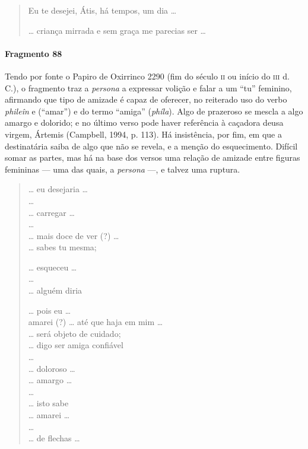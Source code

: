 {\begin{verse}
Eu te desejei, Átis, há tempos, um dia \ldots{}

\ast\quad\ast\quad\ast

\ldots{} criança mirrada e sem graça me parecias ser \ldots{}
\end{verse}

\paragraph{Fragmento 88}

{\small Tendo por fonte o Papiro de Oxirrinco 2290 (fim do século \textsc{ii} ou início do \textsc{iii} d. C.), o fragmento traz a \textit{persona} a expressar volição e falar a um ``tu'' feminino, afirmando que tipo de amizade é capaz de oferecer, no reiterado uso do verbo \textit{phileîn} e (``amar'') e do termo ``amiga'' (\textit{phíla}). Algo de prazeroso se mescla a algo amargo e dolorido; e no último verso pode haver referência à caçadora deusa virgem, Ártemis (Campbell, 1994, p. 113). Há insistência, por fim, em que a destinatária saiba de algo que não se revela, e a menção do esquecimento. Difícil somar as partes, mas há na base dos versos  uma relação de amizade entre figuras femininas --- uma das quais, a \textit{persona} ---, e talvez uma ruptura.}

\begin{verse}
\ldots{} eu desejaria \ldots{}\\
\ldots{}\\
\ldots{} carregar \ldots{}\\
\ldots{}\\
\ldots{} mais doce de ver (?) \ldots{}\\
\ldots{} sabes tu mesma;

\ldots{} esqueceu \ldots{}\\
\ldots{}\\
\ldots{} alguém diria

\ldots{} pois eu \ldots{}\\
amarei (?) \ldots{} até que haja em mim \ldots{}\\
\ldots{} será objeto de cuidado;\\
\ldots{} digo ser amiga confiável \\
\ldots{}\\
\ldots{} doloroso \ldots{}\\
\ldots{} amargo \ldots{}\\
\ldots{}\\
\ldots{} isto sabe\\
\ldots{} amarei \ldots{}\\
\ldots{}\\
\ldots{} de flechas \ldots{}
\end{verse}


}
